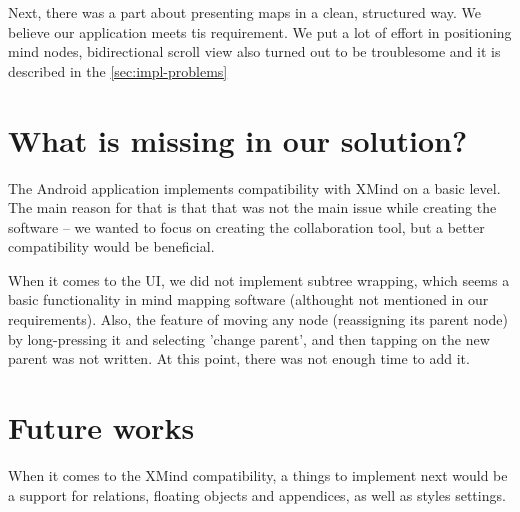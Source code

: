 Next, there was a part about presenting maps in a clean, structured way. We believe our application meets tis requirement. We put a lot of effort in positioning mind nodes, bidirectional scroll view also turned out to be troublesome and it is described in the \cref{sec:impl-problems}

\section{What is missing in our solution?}
\label{summary-missing}
The Android application implements compatibility with XMind on a basic level. The main reason for that is that that was not the main issue while creating the software -- we wanted to focus on creating the collaboration tool, but a better compatibility would be beneficial. 

When it comes to the UI, we did not implement subtree wrapping, which seems a basic functionality in mind mapping software (althought not mentioned in our requirements). Also, the feature of moving any node (reassigning its parent node) by long-pressing it and selecting 'change parent', and then tapping on the new parent was not written. At this point, there was not enough time to add it.

\section{Future works}
\label{summary-future}
When it comes to the XMind compatibility, a things to implement next would be a support for relations, floating objects and appendices, as well as styles settings. 
